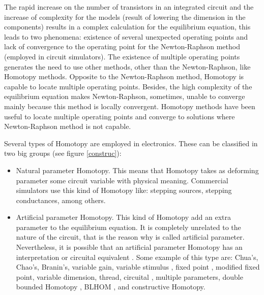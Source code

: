 \documentclass[conference,letterpaper,onecolumn]{IEEEtran}
\begin{document}
The rapid increase on the number of transistors in an integrated circuit and the increase of complexity for the models (result of lowering the dimension in the components) results in a complex calculation for the equilibrium equation, this leads to two phenomena:  existence of several unexpected operating points  and lack of convergence to the operating point for the Newton-Raphson method (employed in circuit simulators). The existence of multiple operating points generates the need to use other methods, other than the Newton-Raphson, like Homotopy methods. Opposite to the Newton-Raphson method, Homotopy is capable to locate multiple operating points. Besides, the high complexity of the equilibrium equation makes Newton-Raphson, sometimes, unable to converge mainly because this method is locally convergent. Homotopy methods \cite{cont_bra,cont_chu1,cont_hun,homo_jaewook} have been useful to locate multiple operating points and converge to solutions where Newton-Raphson method is not capable.

Several types of Homotopy are employed in electronics. These can be classified in two big groups (see figure \ref{construc}):

\begin{itemize}
\item  Natural parameter Homotopy. This means that Homotopy takes as deforming parameter some circuit variable with physical meaning. Commercial simulators use this kind of Homotopy like: stepping sources, stepping conductances, among others.
\item  Artificial parameter Homotopy. This kind of Homotopy add an extra parameter to the equilibrium equation. It is completely unrelated to the nature of the circuit, that is the reason why is called artificial parameter. Nevertheless, it is possible that an artificial parameter Homotopy has an interpretation or circuital equivalent \cite{homo_ArtificialP}. Some example of this type are: Chua's\cite{cont_chu1}, Chao's\cite{cont_kao}, Branin's\cite{cont_bra}, variable gain\cite{homo_ArtificialP}, variable stimulus \cite{homo_ArtificialP}, fixed point \cite{cont_mix}, modified fixed point\cite{homo_yamamura},
variable dimension\cite{cont_leu1,cont_koya1,cont_yama}, thread\cite{homo_threading}, circuital \cite{homo_ushida1}, multiple parameters\cite{homo_dobletrazado,homo_DWolfMulti}, double bounded Homotopy \cite{homo_iscas05}, BLHOM \cite{BHLHOM}, and constructive Homotopy\cite{homo_jaewook}. 
\end{itemize}
\end{document}
